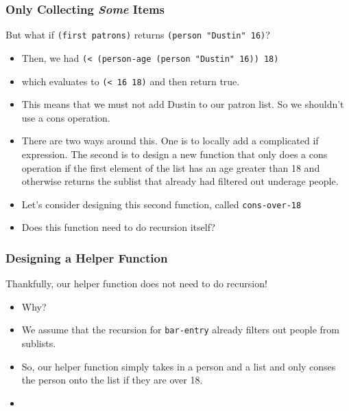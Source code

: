 \documentclass{beamer}
\begin{document}
\begin{frame}
  \frametitle{Only Collecting \emph{Some} Items}
  But what if \texttt{(first patrons)} returns \texttt{(person "Dustin" 16)}?
  \begin{itemize}
  \item<2-> Then, we had \texttt{(< (person-age (person "Dustin" 16)) 18)}
  \item<3-> which evaluates to \texttt{(< 16 18)} and then return true.
  \item<4-> This means that we must not add Dustin to our patron list. So we shouldn't use a cons operation.
  \item<5-> There are two ways around this. One is to locally add a complicated if expression. The second is to design
    a new function that only does a cons operation if the first element of the list has an age greater than 18 and otherwise
    returns the sublist that already had filtered out underage people.
  \item<6-> Let's consider designing this second function, called \texttt{cons-over-18}
  \item<7-> Does this function need to do recursion itself?
  \end{itemize}
\end{frame}


\begin{frame}
  \frametitle{Designing a Helper Function}
  Thankfully, our helper function does not need to do recursion!
  \begin{itemize}
  \item<2-> Why?
  \item<3-> We assume that the recursion for \texttt{bar-entry} already filters out people from sublists.
  \item<4-> So, our helper function simply takes in a person and a list
    and only conses the person onto the list if they are over 18.
  \item<5-> \ConsOver
  \end{itemize}
\end{frame}
\end{document}
